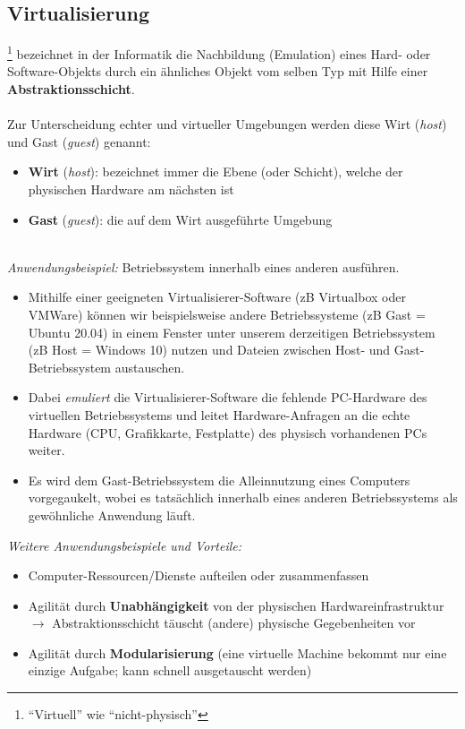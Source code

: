 \clearpage
\subsection{Virtualisierung}
\footnote{``Virtuell'' wie ``nicht-physisch''} bezeichnet in der Informatik die Nachbildung (Emulation) eines Hard- oder Software-Objekts durch ein ähnliches Objekt vom selben Typ mit Hilfe einer \textbf{Abstraktionsschicht}.
~\\~\\
Zur Unterscheidung echter und virtueller Umgebungen werden diese  Wirt (\textit{host}) und Gast (\textit{guest}) genannt:
\begin{itemize}
	\item \textbf{Wirt} (\textit{host}): bezeichnet immer die Ebene (oder Schicht), welche der physischen Hardware am nächsten ist
	\item \textbf{Gast} (\textit{guest}): die auf dem Wirt ausgeführte Umgebung
\end{itemize} 
~\\
\textit{Anwendungsbeispiel:} Betriebssystem innerhalb eines anderen ausführen.
\begin{itemize}
	\item Mithilfe einer geeigneten Virtualisierer-Software (zB Virtualbox oder VMWare) können wir beispielsweise andere Betriebssysteme (zB Gast = Ubuntu 20.04) in einem Fenster unter unserem derzeitigen Betriebssystem (zB Host = Windows 10) nutzen und Dateien zwischen Host- und Gast-Betriebssystem austauschen.
\item Dabei \textit{emuliert} die Virtualisierer-Software die fehlende PC-Hardware des virtuellen Betriebssystems und leitet Hardware-Anfragen an die echte Hardware (CPU, Grafikkarte, Festplatte) des physisch vorhandenen PCs weiter.
\item Es wird dem Gast-Betriebssystem die Alleinnutzung eines Computers vorgegaukelt, wobei es tatsächlich innerhalb eines anderen Betriebssystems als gewöhnliche Anwendung läuft.
\end{itemize}
%
\textit{Weitere Anwendungsbeispiele und Vorteile:}
\begin{itemize}
	\item Computer-Ressourcen/Dienste aufteilen oder zusammenfassen
	\item Agilität durch \textbf{Unabhängigkeit} von der physischen Hardwareinfrastruktur\\
	$\to$ Abstraktionsschicht täuscht (andere) physische Gegebenheiten vor
	\item Agilität durch \textbf{Modularisierung} (eine virtuelle Machine bekommt nur eine einzige Aufgabe; kann schnell ausgetauscht werden)
\end{itemize} 
